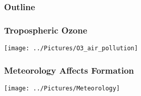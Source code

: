 \begin{frame}
    \frametitle{Outline} 
    \tableofcontents[currentsection]
\end{frame} 

\begin{frame}
    \frametitle{Tropospheric Ozone}
    \vspace{-0.5cm}
    \begin{center}
        \texttt{[image: ../Pictures/O3\_air\_pollution]} 
    \end{center} 
\end{frame} 

\begin{frame}
    \frametitle{Meteorology Affects  Formation}
    \vspace{-0.65cm}
    \begin{center}
        \texttt{[image: ../Pictures/Meteorology]}
    \end{center} 
\end{frame}
